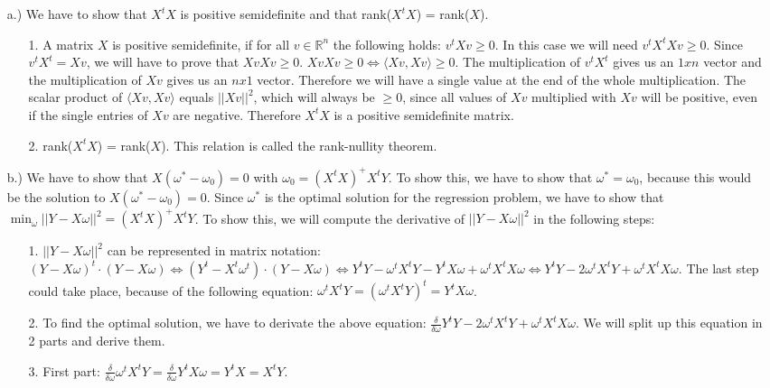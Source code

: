 \documentclass[%
   10pt,              %
   a4paper,           %
   DIV10,             %
]{scrartcl}%
\begin{document}
\begin{itemize}
	\item[a.)] We have to show that $X^tX$ is positive semidefinite and that rank($X^tX$) = rank($X$). 
	\begin{enumerate}
		\item[1.] A matrix $X$ is positive semidefinite, if for all $v \in \mathbb{R}^n$ the following holds: $v^t X v \geq 0$. In this case we will need $v^t X^tX v \geq 0$. Since $v^t X^t = X v$, we will have to prove that $X v X v \geq 0$. $X v X v \geq 0 \Leftrightarrow \langle Xv, Xv\rangle \geq 0$. The multiplication of $v^t X^t$ gives us an $1xn$ vector and the multiplication of $X v$ gives us an $nx1$ vector. Therefore we will have a single value at the end of the whole multiplication. The scalar product of $\langle Xv, Xv\rangle$ equals $|| Xv||^2$, which will always be $\geq 0$, since all values of $Xv$ multiplied with $Xv$ will be positive, even if the single entries of $Xv$ are negative. Therefore $X^tX$ is a positive semidefinite matrix.
		\item[2.] rank($X^t X$) = rank($X$). This relation is called the rank-nullity theorem. 
		\end{enumerate}
	\item[b.)] We have to show that $X(\omega^* - \omega_0) = 0$ with $\omega_0 = (X^tX)^+X^tY$. To show this, we have to show that $\omega^* = \omega_0$, because this would be the solution to $X(\omega^* - \omega_0) = 0$. Since $\omega^*$ is the optimal solution for the regression problem, we have to show that $\min_\omega|| Y - X\omega||^2 = (X^tX)^+X^tY$. To show this, we will compute the derivative of $|| Y - X\omega||^2$ in the following steps: 
	\begin{enumerate}
		\item[1.] $|| Y - X\omega||^2$ can be represented in matrix notation: $(Y - X\omega)^t \cdot (Y - X\omega) \Leftrightarrow (Y^t - X^t\omega^t) \cdot (Y - X\omega) \Leftrightarrow Y^t Y - \omega^t X^t Y - Y^t X \omega + \omega^t X^t X \omega \Leftrightarrow Y^t Y - 2\omega^t X^t Y + \omega^t X^t X \omega$. The last step could take place, because of the following equation: $\omega^t X^t Y = (\omega^t X^t Y)^t = Y^t X \omega$.
		\item[2.] To find the optimal solution, we have to derivate the above equation: $\frac{\delta}{\delta\omega} Y^t Y - 2\omega^t X^t Y + \omega^t X^t X \omega$. We will split up this equation in 2 parts and derive them.
		\item[3.] First part: $\frac{\delta}{\delta \omega} \omega^t X^t Y = \frac{\delta}{\delta \omega} Y^t X \omega = Y^t X = X^t Y$.

\end{enumerate}
\end{itemize}
\end{document}
